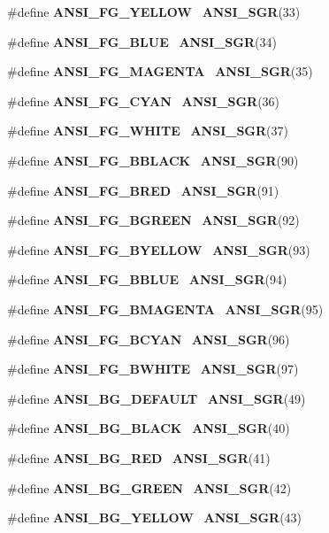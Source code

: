 \begin{DoxyCompactItemize}
\item 
\#define \textbf{ A\+N\+S\+I\+\_\+\+F\+G\+\_\+\+Y\+E\+L\+L\+OW}~\textbf{ A\+N\+S\+I\+\_\+\+S\+GR}(33)
\item 
\#define \textbf{ A\+N\+S\+I\+\_\+\+F\+G\+\_\+\+B\+L\+UE}~\textbf{ A\+N\+S\+I\+\_\+\+S\+GR}(34)
\item 
\#define \textbf{ A\+N\+S\+I\+\_\+\+F\+G\+\_\+\+M\+A\+G\+E\+N\+TA}~\textbf{ A\+N\+S\+I\+\_\+\+S\+GR}(35)
\item 
\#define \textbf{ A\+N\+S\+I\+\_\+\+F\+G\+\_\+\+C\+Y\+AN}~\textbf{ A\+N\+S\+I\+\_\+\+S\+GR}(36)
\item 
\#define \textbf{ A\+N\+S\+I\+\_\+\+F\+G\+\_\+\+W\+H\+I\+TE}~\textbf{ A\+N\+S\+I\+\_\+\+S\+GR}(37)
\item 
\#define \textbf{ A\+N\+S\+I\+\_\+\+F\+G\+\_\+\+B\+B\+L\+A\+CK}~\textbf{ A\+N\+S\+I\+\_\+\+S\+GR}(90)
\item 
\#define \textbf{ A\+N\+S\+I\+\_\+\+F\+G\+\_\+\+B\+R\+ED}~\textbf{ A\+N\+S\+I\+\_\+\+S\+GR}(91)
\item 
\#define \textbf{ A\+N\+S\+I\+\_\+\+F\+G\+\_\+\+B\+G\+R\+E\+EN}~\textbf{ A\+N\+S\+I\+\_\+\+S\+GR}(92)
\item 
\#define \textbf{ A\+N\+S\+I\+\_\+\+F\+G\+\_\+\+B\+Y\+E\+L\+L\+OW}~\textbf{ A\+N\+S\+I\+\_\+\+S\+GR}(93)
\item 
\#define \textbf{ A\+N\+S\+I\+\_\+\+F\+G\+\_\+\+B\+B\+L\+UE}~\textbf{ A\+N\+S\+I\+\_\+\+S\+GR}(94)
\item 
\#define \textbf{ A\+N\+S\+I\+\_\+\+F\+G\+\_\+\+B\+M\+A\+G\+E\+N\+TA}~\textbf{ A\+N\+S\+I\+\_\+\+S\+GR}(95)
\item 
\#define \textbf{ A\+N\+S\+I\+\_\+\+F\+G\+\_\+\+B\+C\+Y\+AN}~\textbf{ A\+N\+S\+I\+\_\+\+S\+GR}(96)
\item 
\#define \textbf{ A\+N\+S\+I\+\_\+\+F\+G\+\_\+\+B\+W\+H\+I\+TE}~\textbf{ A\+N\+S\+I\+\_\+\+S\+GR}(97)
\item 
\#define \textbf{ A\+N\+S\+I\+\_\+\+B\+G\+\_\+\+D\+E\+F\+A\+U\+LT}~\textbf{ A\+N\+S\+I\+\_\+\+S\+GR}(49)
\item 
\#define \textbf{ A\+N\+S\+I\+\_\+\+B\+G\+\_\+\+B\+L\+A\+CK}~\textbf{ A\+N\+S\+I\+\_\+\+S\+GR}(40)
\item 
\#define \textbf{ A\+N\+S\+I\+\_\+\+B\+G\+\_\+\+R\+ED}~\textbf{ A\+N\+S\+I\+\_\+\+S\+GR}(41)
\item 
\#define \textbf{ A\+N\+S\+I\+\_\+\+B\+G\+\_\+\+G\+R\+E\+EN}~\textbf{ A\+N\+S\+I\+\_\+\+S\+GR}(42)
\item 
\#define \textbf{ A\+N\+S\+I\+\_\+\+B\+G\+\_\+\+Y\+E\+L\+L\+OW}~\textbf{ A\+N\+S\+I\+\_\+\+S\+GR}(43)

\end{DoxyCompactItemize}
